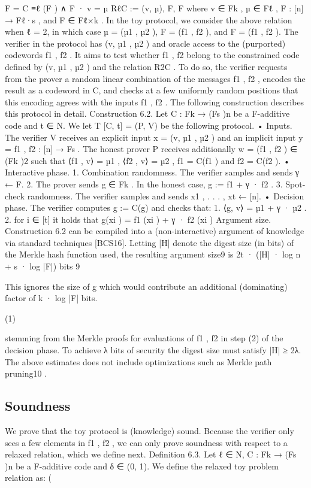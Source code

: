 \documentclass[11pt]{article}
\begin{document}
F = C ≡ℓ (F ) ∧ F · v = µ
RℓC := (v, µ), F, F
where v ∈ Fk , µ ∈ Fℓ , F : [n] → Fℓ·s , and F ∈ Fℓ×k .
In the toy protocol, we consider the above relation when ℓ = 2, in which case µ = (µ1 , µ2 ),
F = (f1 , f2 ), and F = (f1 , f2 ). The verifier in the protocol has (v, µ1 , µ2 ) and oracle access to
the (purported) codewords f1 , f2 . It aims to test whether f1 , f2 belong to the constrained code
defined by (v, µ1 , µ2 ) and the relation R2C . To do so, the verifier requests from the prover a random
linear combination of the messages f1 , f2 , encodes the result as a codeword in C, and checks at
a few uniformly random positions that this encoding agrees with the inputs f1 , f2 . The following
construction describes this protocol in detail.
Construction 6.2. Let C : Fk → (Fs )n be a F-additive code and t ∈ N. We let T [C, t] = (P, V)
be the following protocol.
• Inputs. The verifier V receives an explicit input x = (v, µ1 , µ2 ) and an implicit input y =
f1 , f2 : [n] → Fs . The honest prover P receives additionally w = (f1 , f2 ) ∈ (Fk )2 such that
⟨f1 , v⟩ = µ1 , ⟨f2 , v⟩ = µ2 , f1 = C(f1 ) and f2 = C(f2 ).
• Interactive phase.
1. Combination randomness. The verifier samples and sends γ ← F.
2. The prover sends g ∈ Fk . In the honest case, g := f1 + γ · f2 .
3. Spot-check randomness. The verifier samples and sends x1 , . . . , xt ← [n].
• Decision phase. The verifier computes g := C(g) and checks that:
1. ⟨g, v⟩ = µ1 + γ · µ2 .
2. for i ∈ [t] it holds that g(xi ) = f1 (xi ) + γ · f2 (xi )
Argument size. Construction 6.2 can be compiled into a (non-interactive) argument of knowledge
via standard techniques [BCS16]. Letting |H| denote the digest size (in bits) of the Merkle hash
function used, the resulting argument size9 is
2t · (|H| · log n + s · log |F|) bits
9

This ignores the size of g which would contribute an additional (dominating) factor of k · log |F| bits.


(1)

stemming from the Merkle proofs for evaluations of f1 , f2 in step (2) of the decision phase. To
achieve λ bits of security the digest size must satisfy |H| ≥ 2λ. The above estimates does not
include optimizations such as Merkle path pruning10 .


\subsection{Soundness}



We prove that the toy protocol is (knowledge) sound. Because the verifier only sees a few elements
in f1 , f2 , we can only prove soundness with respect to a relaxed relation, which we define next.
Definition 6.3. Let ℓ ∈ N, C : Fk → (Fs )n be a F-additive code and δ ∈ (0, 1). We define the
relaxed toy problem relation as:
(
\end{document}

